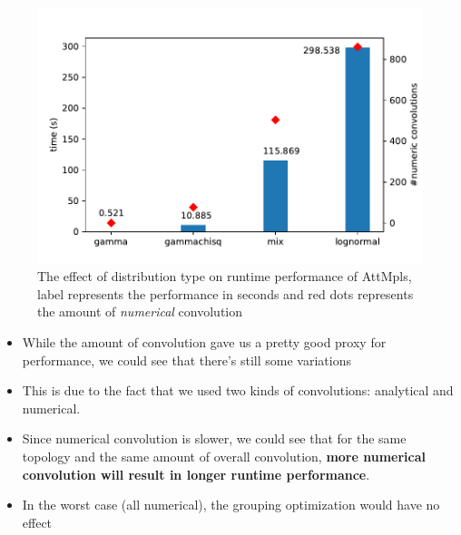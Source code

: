 \documentclass[10pt,sigconf,letterpaper,anonymous,nonacm]{acmart}
\begin{document}
\begin{figure}[h]
    \centering
    \includegraphics[scale=0.5]{distribution}
    \caption{The effect of distribution type on runtime performance of AttMpls, label represents the 
    performance in seconds and red dots represents the amount of \textit{numerical} convolution}
    \label{fig:dist}
\end{figure}

\begin{itemize}
    \item While the amount of convolution gave us a pretty good proxy for performance, we could see 
        that there's still some variations
    \item This is due to the fact that we used two kinds of convolutions: analytical and numerical.
    \item Since numerical convolution is slower, we could see that for the same topology and the same amount of 
        overall convolution, \textbf{more numerical convolution will result in longer runtime performance}.
    \item In the worst case (all numerical), the grouping optimization would have no effect
\end{itemize}


\end{document}
